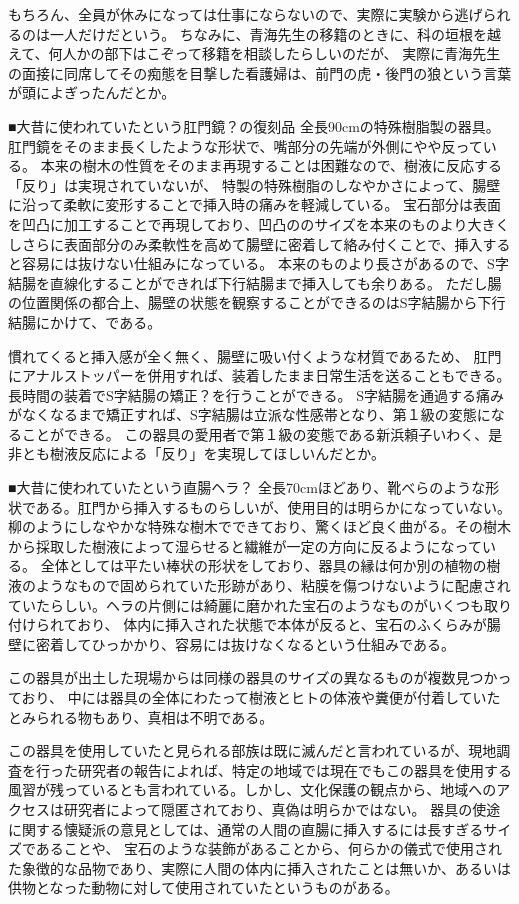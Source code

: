 もちろん、全員が休みになっては仕事にならないので、実際に実験から逃げられるのは一人だけだという。
ちなみに、青海先生の移籍のときに、科の垣根を越えて、何人かの部下はこぞって移籍を相談したらしいのだが、
実際に青海先生の面接に同席してその痴態を目撃した看護婦は、前門の虎・後門の狼という言葉が頭によぎったんだとか。



■大昔に使われていたという肛門鏡？の復刻品
全長90cmの特殊樹脂製の器具。
肛門鏡をそのまま長くしたような形状で、嘴部分の先端が外側にやや反っている。
本来の樹木の性質をそのまま再現することは困難なので、樹液に反応する「反り」は実現されていないが、
特製の特殊樹脂のしなやかさによって、腸壁に沿って柔軟に変形することで挿入時の痛みを軽減している。
宝石部分は表面を凹凸に加工することで再現しており、凹凸ののサイズを本来のものより大きくしさらに表面部分のみ柔軟性を高めて腸壁に密着して絡み付くことで、挿入すると容易には抜けない仕組みになっている。
本来のものより長さがあるので、S字結腸を直線化することができれば下行結腸まで挿入しても余りある。
ただし腸の位置関係の都合上、腸壁の状態を観察することができるのはS字結腸から下行結腸にかけて、である。

慣れてくると挿入感が全く無く、腸壁に吸い付くような材質であるため、
肛門にアナルストッパーを併用すれば、装着したまま日常生活を送ることもできる。
長時間の装着でS字結腸の矯正？を行うことができる。
S字結腸を通過する痛みがなくなるまで矯正すれば、S字結腸は立派な性感帯となり、第１級の変態になることができる。
この器具の愛用者で第１級の変態である新浜頼子いわく、是非とも樹液反応による「反り」を実現してほしいんだとか。




■大昔に使われていたという直腸ヘラ？
全長70cmほどあり、靴べらのような形状である。肛門から挿入するものらしいが、使用目的は明らかになっていない。
柳のようにしなやかな特殊な樹木でできており、驚くほど良く曲がる。その樹木から採取した樹液によって湿らせると繊維が一定の方向に反るようになっている。
全体としては平たい棒状の形状をしており、器具の縁は何か別の植物の樹液のようなもので固められていた形跡があり、粘膜を傷つけないように配慮されていたらしい。ヘラの片側には綺麗に磨かれた宝石のようなものがいくつも取り付けられており、
体内に挿入された状態で本体が反ると、宝石のふくらみが腸壁に密着してひっかかり、容易には抜けなくなるという仕組みである。

この器具が出土した現場からは同様の器具のサイズの異なるものが複数見つかっており、
中には器具の全体にわたって樹液とヒトの体液や糞便が付着していたとみられる物もあり、真相は不明である。

この器具を使用していたと見られる部族は既に滅んだと言われているが、現地調査を行った研究者の報告によれば、特定の地域では現在でもこの器具を使用する風習が残っているとも言われている。しかし、文化保護の観点から、地域へのアクセスは研究者によって隠匿されており、真偽は明らかではない。
器具の使途に関する懐疑派の意見としては、通常の人間の直腸に挿入するには長すぎるサイズであることや、
宝石のような装飾があることから、何らかの儀式で使用された象徴的な品物であり、実際に人間の体内に挿入されたことは無いか、あるいは供物となった動物に対して使用されていたというものがある。

